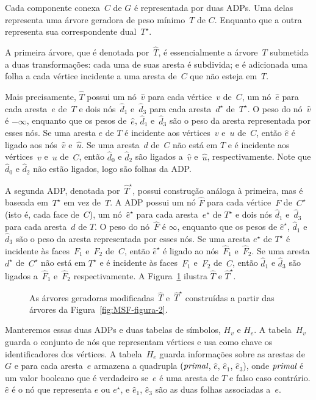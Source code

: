 Cada componente conexa~$C$ de $G$ é representada por duas ADPs.
Uma delas representa uma árvore geradora de peso mínimo~$T$ de $C$.
Enquanto que a outra representa sua correspondente dual~$T^\star$.

A primeira árvore, que é denotada por~$\hat T$, é essencialmente a árvore~$T$ submetida a duas transformações: cada uma de suas aresta é subdivida; e é adicionada uma folha a cada vértice incidente a uma aresta de~$C$ que não esteja em~$T$.

Mais precisamente, $\hat T$ possui um nó~$\hat v$ para cada vértice~$v$ de~$C$, um nó~$\hat e$ para cada aresta~$e$ de~$T$ e dois nós~$\hat d_1$ e~$\hat d_3$ para cada aresta~$d^\star$ de~$T^\star$.
O peso do nó~$\hat v$ é $-\infty$, enquanto que os pesos de~$\hat e$, $\hat d_1$ e~$\hat d_3$ são o peso da aresta representada por esses nós. 
Se uma aresta $e$ de $T$ é incidente aos vértices~$v$ e~$u$ de~$C$, então $\hat e$ é ligado aos nós~$\hat v$ e~$\hat u$.
Se uma aresta~$d$ de~$C$ não está em $T$ e é incidente aos vértices~$v$ e~$u$ de~$C$, então $\hat d_0$ e $\hat d_2$ são ligados a~$\hat v$ e~$\hat u$, respectivamente.
Note que $\hat d_0$ e $\hat d_2$ não estão ligados, logo são folhas da ADP.

A segunda ADP, denotada por~$\hat T^\star$, possui construção análoga à primeira, mas é baseada em~$T^\star$ em vez de~$T$.
A ADP possui um nó $\hat F$ para cada vértice~$F$ de~$C^\star$ (isto é, cada face de~$C$), um nó~$\hat e^\star$ para cada aresta~$e^\star$ de $T^\star$ e dois nós $\hat d_1$ e~$\hat d_3$ para cada aresta~$d$ de $T$.
O peso do nó~$\hat F$ é $\infty$, enquanto que os pesos de $\hat e^\star$, $\hat d_1$ e~$\hat d_3$ são o peso da aresta representada por esses nós.
Se uma aresta $e^\star$ de $T^\star$ é incidente às faces~$F_1$ e~$F_2$ de~$C$, então $\hat e^\star$ é ligado ao nós~$\hat F_1$ e~$\hat F_2$.
Se uma aresta $d^\star$ de~$C^\star$ não está em $T^\star$ e é incidente às faces~$F_1$ e~$F_2$ de~$C$, então $\hat d_1$ e $\hat d_3$ são ligados a~$\hat F_1$ e~$\hat F_2$ respectivamente.
A Figura~\ref{fig:MSF-figura-3} ilustra $\hat T$ e $\hat T^\star$.

\begin{figure}[htb]
\centering

\caption{As árvores geradoras modificadas~$\hat T$ e~$\hat T^\star$ construídas a partir das árvores da Figura~\ref{fig:MSF-figura-2}.}
\label{fig:MSF-figura-3}
\end{figure}
Manteremos essas duas ADPs e duas tabelas de símbolos, $H_v$ e $H_e$. A tabela~$H_v$ guarda o conjunto de nós que representam vértices e usa como chave os identificadores dos vértices.
A tabela~$H_e$ guarda informações sobre as arestas de $G$ e para cada aresta~$e$ armazena a quadrupla $(\textit{primal}$, $\hat e$, $\hat e_1$, $\hat e_3$), onde $\textit{primal}$ é um valor booleano que é verdadeiro se~$e$ é uma aresta de $T$ e falso caso contrário. $\hat e$ é o nó que representa $e$ ou $e^\star$, e $\hat e_1$, $\hat e_3$ são as duas folhas associadas a~$e$. 

